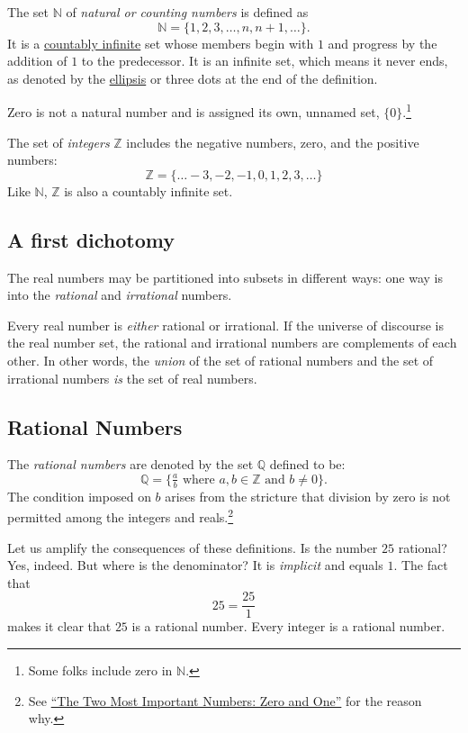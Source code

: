 \documentclass[
  a4paper,
]{article}
\begin{document}
The set \(\mathbb{N}\) of \emph{natural or counting numbers} is defined
as \[
\mathbb{N} = \{1, 2, 3, \dots, n, n+1, \dots\}.
\] It is a \href{https://en.wikipedia.org/wiki/Countable_set}{countably
infinite} set whose members begin with \(1\) and progress by the
addition of \(1\) to the predecessor. It is an infinite set, which means
it never ends, as denoted by the
\href{https://www.grammarly.com/blog/ellipsis/}{ellipsis} or three dots
at the end of the definition.

Zero is not a natural number and is assigned its own, unnamed set,
\(\{0\}\).\footnote{Some folks include zero in \(\mathbb{N}\).}

The set of \emph{integers} \(\mathbb{Z}\) includes the negative numbers,
zero, and the positive numbers: \[
\mathbb{Z} = \{\ldots -3, -2, -1, 0, 1, 2, 3, \dots\}
\] Like \(\mathbb{N}\), \(\mathbb{Z}\) is also a countably infinite set.

\subsection{A first dichotomy}\label{a-first-dichotomy}

The real numbers may be partitioned into subsets in different ways: one
way is into the \emph{rational} and \emph{irrational} numbers.

Every real number is \emph{either} rational or irrational. If the
universe of discourse is the real number set, the rational and
irrational numbers are complements of each other. In other words, the
\emph{union} of the set of rational numbers and the set of irrational
numbers \emph{is} the set of real numbers.

\subsection{Rational Numbers}\label{rational-numbers}

The \emph{rational numbers} are denoted by the set \(\mathbb{Q}\)
defined to be: \[
\mathbb{Q} = \{\tfrac{a}{b} \mbox{ where } a, b \in \mathbb{Z} \mbox{ and } b \neq 0\}.
\] The condition imposed on \(b\) arises from the stricture that
division by zero is not permitted among the integers and
reals.\footnote{See
  \href{https://swanlotus.netlify.app/blogs/the-two-most-important-numbers-zero-and-one}{``The
  Two Most Important Numbers: Zero and One''} for the reason why.}

Let us amplify the consequences of these definitions. Is the number
\(25\) rational? Yes, indeed. But where is the denominator? It is
\emph{implicit} and equals \(1\). The fact that \[
25 = \frac{25}{1}
\] makes it clear that \(25\) is a rational number. Every integer is a
rational number.
\end{document}
